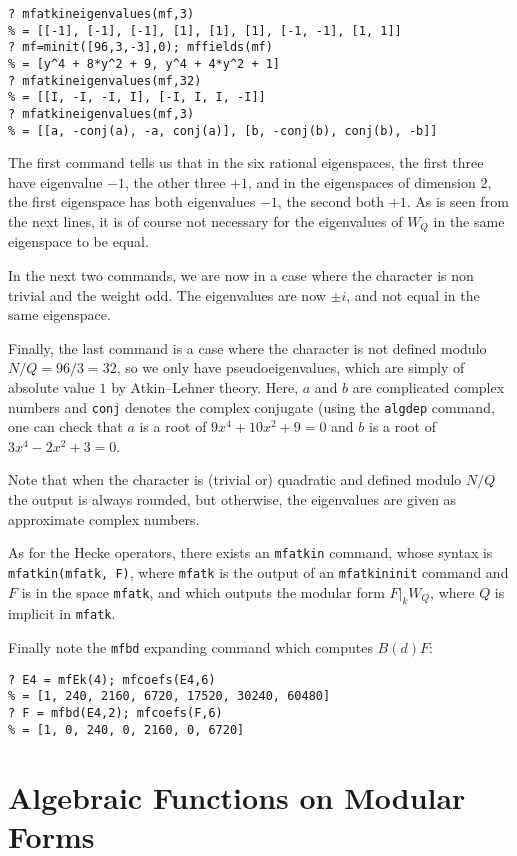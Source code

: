 \documentclass[11pt]{article}
\def\kbd#1{{\tt #1}}
\begin{document}
\begin{verbatim}
? mfatkineigenvalues(mf,3)
% = [[-1], [-1], [-1], [1], [1], [1], [-1, -1], [1, 1]]
? mf=minit([96,3,-3],0); mffields(mf)
% = [y^4 + 8*y^2 + 9, y^4 + 4*y^2 + 1]
? mfatkineigenvalues(mf,32)
% = [[I, -I, -I, I], [-I, I, I, -I]]
? mfatkineigenvalues(mf,3)
% = [[a, -conj(a), -a, conj(a)], [b, -conj(b), conj(b), -b]]
\end{verbatim}

  The first command tells us that in the six rational eigenspaces, the first
  three have eigenvalue $-1$, the other three $+1$, and in the eigenspaces
  of dimension $2$, the first eigenspace has both eigenvalues $-1$, the
  second both $+1$. As is seen from the next lines, it is of course not
  necessary for the eigenvalues of $W_Q$ in the same eigenspace to be equal.

  In the next two commands, we are now in a case where the character is
  non trivial and the weight odd. The eigenvalues are now $\pm i$, and not
  equal in the same eigenspace.

  Finally, the last command is a case where the character is not defined modulo
  $N/Q=96/3=32$, so we only have pseudoeigenvalues, which are simply of
  absolute value $1$ by Atkin--Lehner theory. Here, $a$ and $b$ are
  complicated complex numbers and \kbd{conj} denotes the complex conjugate
  (using the \kbd{algdep} command, one can check that $a$ is a root of
  $9x^4+10x^2+9=0$ and $b$ is a root of $3x^4-2x^2+3=0$.

Note that when the character is (trivial or) quadratic and defined modulo
$N/Q$ the output is always rounded, but otherwise, the eigenvalues are given
as approximate complex numbers.

As for the Hecke operators, there exists an \kbd{mfatkin} command, whose
syntax is \kbd{mfatkin(mfatk, F)}, where \kbd{mfatk} is the output of
an \kbd{mfatkininit} command and $F$ is in the space \kbd{mfatk}, and which
outputs the modular form $F|_kW_Q$, where $Q$ is implicit in \kbd{mfatk}.

Finally note the \kbd{mfbd} expanding command which computes $B(d)F$:

\begin{verbatim}
? E4 = mfEk(4); mfcoefs(E4,6)
% = [1, 240, 2160, 6720, 17520, 30240, 60480]
? F = mfbd(E4,2); mfcoefs(F,6)
% = [1, 0, 240, 0, 2160, 0, 6720]
\end{verbatim}

\section{Algebraic Functions on Modular Forms}
\end{document}
